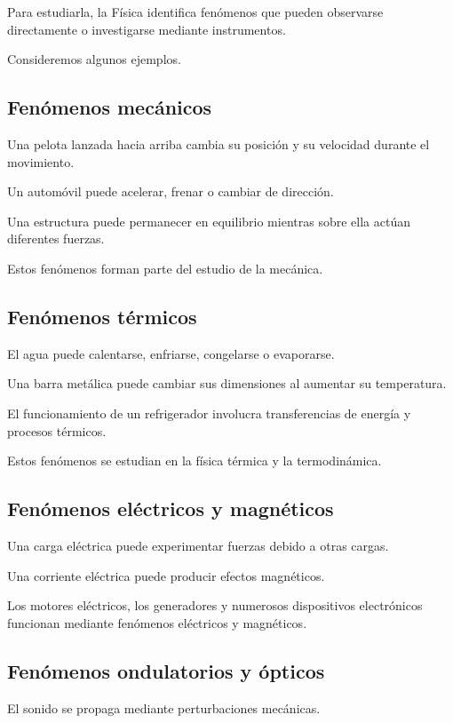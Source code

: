 Para estudiarla, la Física identifica fenómenos que pueden
observarse directamente o investigarse mediante instrumentos.

Consideremos algunos ejemplos.

\subsection{Fenómenos mecánicos}

Una pelota lanzada hacia arriba cambia su posición
y su velocidad durante el movimiento.

Un automóvil puede acelerar, frenar o cambiar de dirección.

Una estructura puede permanecer en equilibrio mientras
sobre ella actúan diferentes fuerzas.

Estos fenómenos forman parte del estudio de la mecánica.

\subsection{Fenómenos térmicos}

El agua puede calentarse, enfriarse, congelarse o evaporarse.

Una barra metálica puede cambiar sus dimensiones
al aumentar su temperatura.

El funcionamiento de un refrigerador involucra transferencias
de energía y procesos térmicos.

Estos fenómenos se estudian en la física térmica
y la termodinámica.

\subsection{Fenómenos eléctricos y magnéticos}

Una carga eléctrica puede experimentar fuerzas debido
a otras cargas.

Una corriente eléctrica puede producir efectos magnéticos.

Los motores eléctricos, los generadores y numerosos
dispositivos electrónicos funcionan mediante fenómenos
eléctricos y magnéticos.

\subsection{Fenómenos ondulatorios y ópticos}

El sonido se propaga mediante perturbaciones mecánicas.


